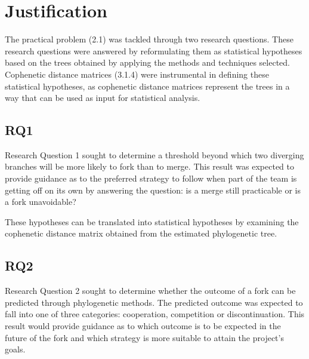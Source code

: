 
\section{Justification}
The practical problem (2.1) was tackled through two research questions. These research questions were answered by reformulating them as statistical hypotheses based on the trees obtained by applying the methods and techniques selected. Cophenetic distance matrices (3.1.4) were instrumental in defining these statistical hypotheses, as cophenetic distance matrices represent the trees in a way that can be used as input for statistical analysis.

\subsection{RQ1}
Research Question 1 sought to determine a threshold beyond which two diverging branches will be more likely to fork than to merge. This result was expected to provide guidance as to the preferred strategy to follow when part of the team is getting off on its own by answering the question: is a merge still practicable or is a fork unavoidable?



\noindent
These hypotheses can be translated into statistical hypotheses by examining the cophenetic distance matrix obtained from the estimated phylogenetic tree.



\subsection{RQ2}
Research Question 2 sought to determine whether the outcome of a fork can be predicted through phylogenetic methods. The predicted outcome was expected to fall into one of three categories: cooperation, competition or discontinuation. This result would provide guidance as to which outcome is to be expected in the future of the fork and which strategy is more suitable to attain the project's goals. 

